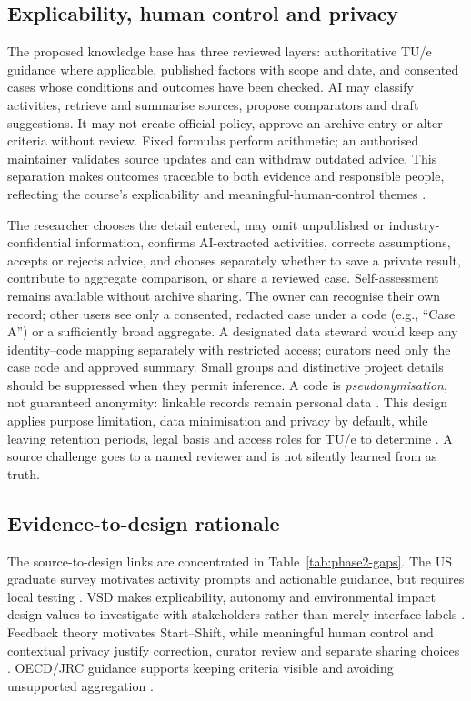 \documentclass[11pt,a4paper]{article}
\begin{document}
\subsection{Explicability, human control and privacy}
The proposed knowledge base has three reviewed layers: authoritative TU/e guidance where applicable, published factors with scope and date, and consented cases whose conditions and outcomes have been checked. AI may classify activities, retrieve and summarise sources, propose comparators and draft suggestions. It may not create official policy, approve an archive entry or alter criteria without review. Fixed formulas perform arithmetic; an authorised maintainer validates source updates and can withdraw outdated advice. This separation makes outcomes traceable to both evidence and responsible people, reflecting the course's explicability and meaningful-human-control themes \citep{friedman2019shaping,santoni2018control,eu_ethics_2021}.

The researcher chooses the detail entered, may omit unpublished or industry-confidential information, confirms AI-extracted activities, corrects assumptions, accepts or rejects advice, and chooses separately whether to save a private result, contribute to aggregate comparison, or share a reviewed case. Self-assessment remains available without archive sharing. The owner can recognise their own record; other users see only a consented, redacted case under a code (e.g., ``Case A'') or a sufficiently broad aggregate. A designated data steward would keep any identity--code mapping separately with restricted access; curators need only the case code and approved summary. Small groups and distinctive project details should be suppressed when they permit inference. A code is \emph{pseudonymisation}, not guaranteed anonymity: linkable records remain personal data \citep{edpb2025pseudonymisation,gdpr2016}. This design applies purpose limitation, data minimisation and privacy by default, while leaving retention periods, legal basis and access roles for TU/e to determine \citep{gdpr2016,nissenbaum2004privacy}. A source challenge goes to a named reviewer and is not silently learned from as truth.

\subsection{Evidence-to-design rationale}
The source-to-design links are concentrated in Table~\ref{tab:phase2-gaps}. The US graduate survey motivates activity prompts and actionable guidance, but requires local testing \citep{shiekh2026graduate}. VSD makes explicability, autonomy and environmental impact design values to investigate with stakeholders rather than merely interface labels \citep{friedman2019shaping}. Feedback theory motivates Start--Shift, while meaningful human control and contextual privacy justify correction, curator review and separate sharing choices \citep{carver1982control,hattie2007feedback,santoni2018control,nissenbaum2004privacy}. OECD/JRC guidance supports keeping criteria visible and avoiding unsupported aggregation \citep{oecd2008composite}.
\end{document}

